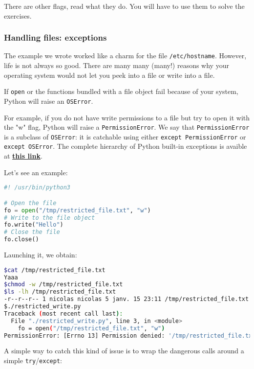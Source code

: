 \documentclass[12pt]{article}
\let\oldhref\href
\renewcommand{\href}[2]{\oldhref{#1}{\bfseries#2}}
\begin{document}
There are other flags, read what they do. You will have to use them to solve the exercises.

\subsubsection{Handling files: exceptions}

The example we wrote worked like a charm for the file \texttt{/etc/hostname}. However, life is not always so good. There are many many (many!) reasons why your operating system would not let you peek into a file or write into a file.

If \texttt{open} or the functions bundled with a file object fail because of your system, Python will raise an \texttt{OSError}.

For example, if you do not have write permissions to a file but try to open it with the "w" flag, Python will raise a \texttt{PermissionError}.
We say that \texttt{PermissionError} is a subclass of \texttt{OSError}: it is catchable using either \texttt{except PermissionError} or \texttt{except OSError}. The complete hierarchy of Python built-in exceptions is avaible at \href{https://docs.python.org/3.5/library/exceptions.html\#exception-hierarchy}{this link}.

Let's see an example:

\begin{lstlisting}[language=python,style=codestyle,title=restricted\_write.py]
#! /usr/bin/python3

# Open the file
fo = open("/tmp/restricted_file.txt", "w")
# Write to the file object
fo.write("Hello")
# Close the file
fo.close()
\end{lstlisting}

Launching it, we obtain:

\begin{lstlisting}[language=bash]
$cat /tmp/restricted_file.txt 
Yaaa
$chmod -w /tmp/restricted_file.txt
$ls -lh /tmp/restricted_file.txt 
-r--r--r-- 1 nicolas nicolas 5 janv. 15 23:11 /tmp/restricted_file.txt
$./restricted_write.py 
Traceback (most recent call last):
  File "./restricted_write.py", line 3, in <module>
    fo = open("/tmp/restricted_file.txt", "w")
PermissionError: [Errno 13] Permission denied: '/tmp/restricted_file.txt'
\end{lstlisting}

A simple way to catch this kind of issue is to wrap the dangerous calls around a simple \texttt{try}/\texttt{except}:
\end{document}
